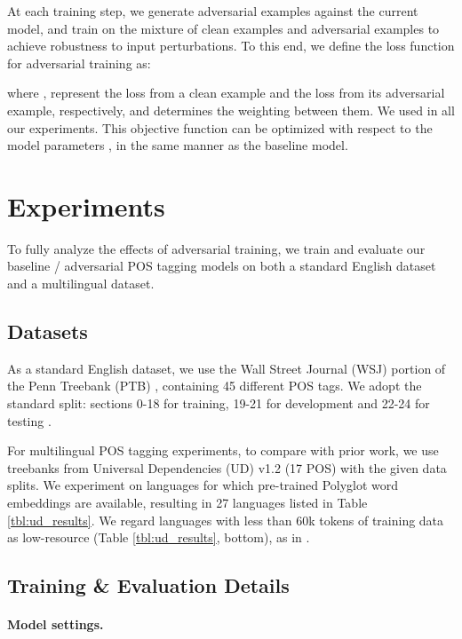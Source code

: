 \documentclass[11pt,a4paper]{article}
\begin{document}
At each training step, we
generate adversarial examples against the current model, and train on the mixture of clean examples and adversarial examples to achieve robustness to input perturbations.
To this end, we define the loss function for adversarial training as:

where
,  represent the loss from a clean example and the loss from its adversarial example, respectively, and  determines the weighting between them.
We used  in all our experiments.
This objective function can be optimized with respect to the model parameters , in the same manner as the baseline model.




\section{Experiments}
To fully analyze the effects of adversarial training,
we train and evaluate our baseline \!/\! adversarial POS tagging models on both a standard English dataset and a multilingual dataset.

\subsection{Datasets}
As a standard English dataset, we use the Wall Street Journal (WSJ) portion of the Penn Treebank (PTB) \cite{Marcus:1993:BLA:972470.972475}, containing 45 different POS tags.
We adopt the standard split: sections 0-18 for training, 19-21 for development and 22-24 for testing \cite{Collins2002,Manning:2011:from97to100}.


For multilingual POS tagging experiments,
to compare with prior work,
we use treebanks from Universal Dependencies (UD) v1.2 \cite{11234/1-1548} (17 POS) with the given data splits.
We experiment on languages for which pre-trained Polyglot word embeddings \cite{polyglot:2013:ACL-CoNLL} are available, resulting in 27 languages listed in Table \ref{tbl:ud_results}.
We regard languages with less than 60k tokens of training data as low-resource (Table \ref{tbl:ud_results}, bottom), as in .

\subsection{Training \& Evaluation Details}

\paragraph{Model settings.}
\end{document}

